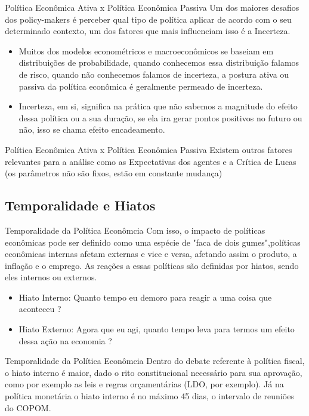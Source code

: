 \documentclass[xcolor=dvipsnames]{beamer}
\begin{document}
\begin{frame}{Política Econômica Ativa x Política Econômica Passiva}
Um dos maiores desafios dos policy-makers é perceber qual tipo de política aplicar de acordo com o seu determinado contexto, um dos fatores que mais influenciam isso é a Incerteza.
\begin{itemize}
    \item Muitos dos modelos econométricos e macroeconômicos se baseiam em distribuições de probabilidade, quando conhecemos essa distribuição falamos de risco, quando não conhecemos falamos de incerteza, a postura ativa ou passiva da política econômica é geralmente permeado de incerteza.
    \item Incerteza, em si, significa  na prática que não sabemos a magnitude do efeito dessa política ou a sua duração, se ela ira gerar pontos positivos no futuro ou não, isso se chama efeito encadeamento. 
\end{itemize}

\end{frame}
\begin{frame}{Política Econômica Ativa x Política Econômica Passiva}
Existem outros fatores relevantes para a análise como as Expectativas dos agentes e a Crítica de Lucas (os parâmetros não são fixos, estão em constante mudança)
\end{frame}
\subsection{Temporalidade e Hiatos}
\begin{frame}{Temporalidade da Política Econômcia}
Com isso, o impacto de políticas econômicas pode ser definido como uma espécie de "faca de dois gumes",políticas econômicas internas afetam externas e vice e versa, afetando assim o produto, a inflação e o emprego. As reações a essas políticas são definidas por hiatos, sendo eles internos ou externos. 
\begin{itemize}
    \item Hiato Interno: Quanto tempo eu demoro para reagir a uma coisa que aconteceu ? 
    \item Hiato Externo: Agora que eu agi, quanto tempo leva para termos um efeito dessa ação na economia ?
\end{itemize}
\end{frame}
\begin{frame}{Temporalidade da Política Econômcia}
Dentro do debate referente à política fiscal, o hiato interno é maior, dado o rito constitucional necessário para sua aprovação, como por exemplo as leis e regras orçamentárias (LDO, por exemplo). Já na política monetária o hiato interno é no máximo 45 dias, o intervalo de reuniões do COPOM. 
\end{frame}
\end{document}
